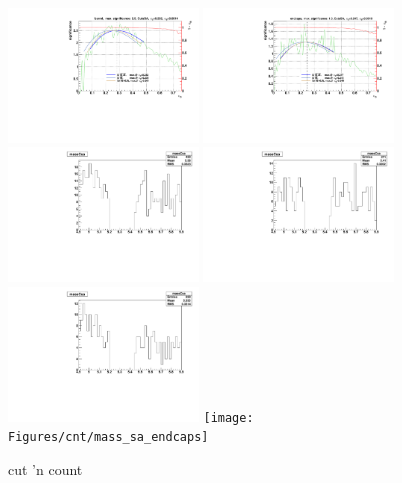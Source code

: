 \begin{figure}[!h]
  \centering
  \includegraphics[width=0.45\textwidth]{Figures/cnt/CutsSA_barrel_eff}
  \includegraphics[width=0.45\textwidth]{Figures/cnt/CutsSA_endcaps_eff}
  \includegraphics[width=0.45\textwidth]{Figures/cnt/SA_barrel_mass}
  \includegraphics[width=0.45\textwidth]{Figures/cnt/SA_endcaps_mass}
  \includegraphics[width=0.45\textwidth]{Figures/cnt/mass_sa_barrel}
  \texttt{[image: Figures/cnt/mass\_sa\_endcaps]}
  \caption{cut 'n count}
\end{figure}






